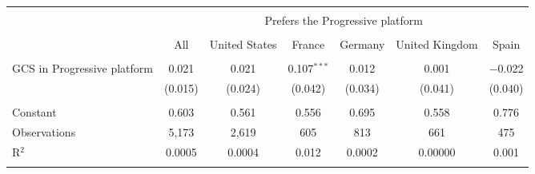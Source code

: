 
\begin{tabular}{@{\extracolsep{5pt}}lcccccc} 
\\[-1.8ex]\hline 
\hline \\[-1.8ex] 
 & \multicolumn{6}{c}{Prefers the Progressive platform} \\ 
\cline{2-7} 
\\[-1.8ex] & All & United States & France & Germany & United Kingdom & Spain \\ 
\hline \\[-1.8ex] 
 GCS in Progressive platform & 0.021 & 0.021 & 0.107$^{***}$ & 0.012 & 0.001 & $-$0.022 \\ 
  & (0.015) & (0.024) & (0.042) & (0.034) & (0.041) & (0.040) \\ 
 \hline \\[-1.8ex] 
Constant & 0.603 & 0.561 & 0.556 & 0.695 & 0.558 & 0.776 \\ 
Observations & 5,173 & 2,619 & 605 & 813 & 661 & 475 \\ 
R$^{2}$ & 0.0005 & 0.0004 & 0.012 & 0.0002 & 0.00000 & 0.001 \\ 
\hline 
\hline \\[-1.8ex] 
\end{tabular} 